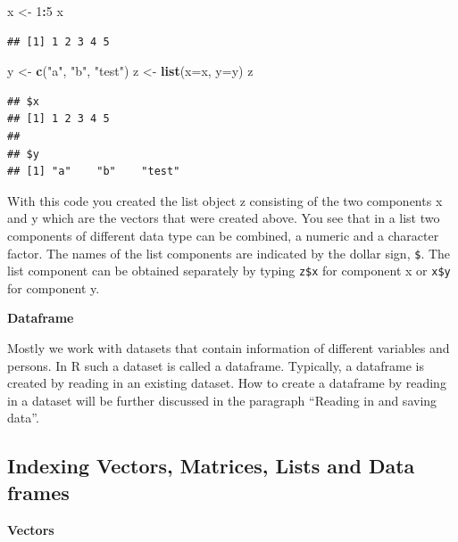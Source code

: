 \documentclass[
]{book}
\newenvironment{Shaded}{\begin{snugshade}}{\end{snugshade}}
\newcommand{\DataTypeTok}[1]{\textcolor[rgb]{0.13,0.29,0.53}{#1}}
\newcommand{\DecValTok}[1]{\textcolor[rgb]{0.00,0.00,0.81}{#1}}
\newcommand{\KeywordTok}[1]{\textcolor[rgb]{0.13,0.29,0.53}{\textbf{#1}}}
\newcommand{\NormalTok}[1]{#1}
\newcommand{\OperatorTok}[1]{\textcolor[rgb]{0.81,0.36,0.00}{\textbf{#1}}}
\newcommand{\StringTok}[1]{\textcolor[rgb]{0.31,0.60,0.02}{#1}}
\begin{document}
\begin{Shaded}
\begin{Highlighting}[]
\NormalTok{x <-}\StringTok{ }\DecValTok{1}\OperatorTok{:}\DecValTok{5}
\NormalTok{x}
\end{Highlighting}
\end{Shaded}

\begin{verbatim}
## [1] 1 2 3 4 5
\end{verbatim}

\begin{Shaded}
\begin{Highlighting}[]
\NormalTok{y <-}\StringTok{ }\KeywordTok{c}\NormalTok{(}\StringTok{"a"}\NormalTok{, }\StringTok{"b"}\NormalTok{, }\StringTok{"test"}\NormalTok{)}
\NormalTok{z <-}\StringTok{ }\KeywordTok{list}\NormalTok{(}\DataTypeTok{x=}\NormalTok{x, }\DataTypeTok{y=}\NormalTok{y)}
\NormalTok{z}
\end{Highlighting}
\end{Shaded}

\begin{verbatim}
## $x
## [1] 1 2 3 4 5
## 
## $y
## [1] "a"    "b"    "test"
\end{verbatim}

With this code you created the list object z consisting of the two
components x and y which are the vectors that were created above. You
see that in a list two components of different data type can be
combined, a numeric and a character factor. The names of the list
components are indicated by the dollar sign, \texttt{\$}. The list
component can be obtained separately by typing \texttt{z\$x} for
component x or \texttt{x\$y} for component y.

\textbf{Dataframe}

Mostly we work with datasets that contain information of different
variables and persons. In R such a dataset is called a dataframe.
Typically, a dataframe is created by reading in an existing dataset. How
to create a dataframe by reading in a dataset will be further discussed
in the paragraph ``Reading in and saving data''.

\hypertarget{indexing-vectors-matrices-lists-and-data-frames}{%
\subsection{Indexing Vectors, Matrices, Lists and Data
frames}\label{indexing-vectors-matrices-lists-and-data-frames}}

\textbf{Vectors}
\end{document}
